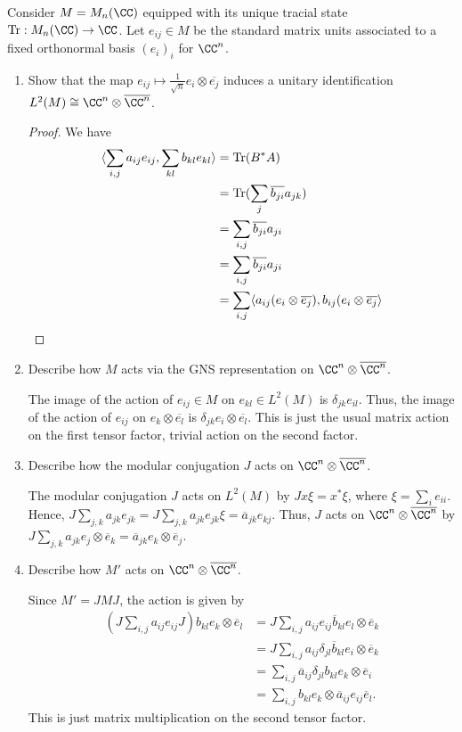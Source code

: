 \documentclass{article}
\begin{document}
 Consider $M = M_n(\CC)$ equipped with its unique tracial state $\tr : M_n(\CC) \to \CC$. Let $e_{ij} \in M$ be
the standard matrix units associated to a fixed orthonormal basis $(e_i)_i$ for $\CC^n$.
\begin{enumerate}
\item Show that the map $e_{ij} \mapsto \frac{1}{\sqrt{n}} e_i \otimes \overline{e_j}$ induces a unitary identification
  $L^2(M) \cong \CC^n \otimes \overline{\CC^n}$.
  \begin{proof}
    We have
    \begin{align*}
      \langle \sum_{i,j} a_{ij} e_{ij}, \sum_{kl} b_{kl} e_{kl} \rangle & = \operatorname{Tr}(B^* A) \\
      & = \operatorname{Tr}(\sum_j \overline{b_{ji}} a_{jk}) \\
      & = \sum_{i,j} \overline{b_{ji}} a_{ji} \\
      & = \sum_{i,j} \overline{b_{ji}} a_{ji} \\
      & = \sum_{i,j} \langle a_{ij} (e_i \otimes \overline{e_j}),  b_{ij} (e_i \otimes \overline{e_j} \rangle \\
    \end{align*}
  \end{proof}
\item Describe how $M$ acts via the GNS representation on $\CC^n \otimes \overline{\CC^n}$.
  
  The image of the action of $e_{ij} \in M$ on $e_{kl} \in L^2(M)$ is $\delta_{jk} e_{il}$.  Thus,
  the image of the action of $e_{ij}$ on $e_k \otimes \overline{e_l}$ is $\delta_{jk} e_i \otimes \overline{e_l}$.
  This is just the usual matrix action on the first tensor factor, trivial action on the second factor.
    
\item Describe how the modular conjugation $J$ acts on $\CC^n \otimes \overline{\CC^n}$.
  
  The modular conjugation $J$ acts on $L^2(M)$ by $Jx \xi = x^* \xi$, where $\xi = \sum_i e_{ii}$.  Hence,
  $J \sum_{j,k} a_{jk} e_{jk} = J \sum_{j,k} a_{jk} e_{jk} \xi = \overline a_{jk} e_{kj}$.  Thus, $J$
  acts on $\CC^n \otimes \overline{\CC^n}$ by $J \sum_{j,k} a_{jk} e_j \otimes \overline e_k =
  \overline a_{jk} e_k \otimes \overline e_j$.
  
\item Describe how $M'$ acts on $\CC^n \otimes \overline{\CC^n}$.
  
    Since $M' = JMJ$, the action is given by
    \begin{align*}
      (J \sum_{i,j} a_{ij} e_{ij} J) b_{kl} e_k \otimes \overline e_l & = J \sum_{i,j} a_{ij} e_{ij} \overline b_{kl} e_l \otimes \overline e_k \\
      & = J \sum_{i,j} a_{ij} \delta_{jl} \overline b_{kl} e_i \otimes \overline e_k \\
      & = \sum_{i,j} \overline a_{ij} \delta_{jl} b_{kl} e_k \otimes \overline e_i \\
      & = \sum_{i,j}  b_{kl} e_k \otimes \overline a_{ij} e_{ij} \overline e_l.
    \end{align*}
    This is just matrix multiplication on the second tensor factor.
\end{enumerate}
\end{document}
